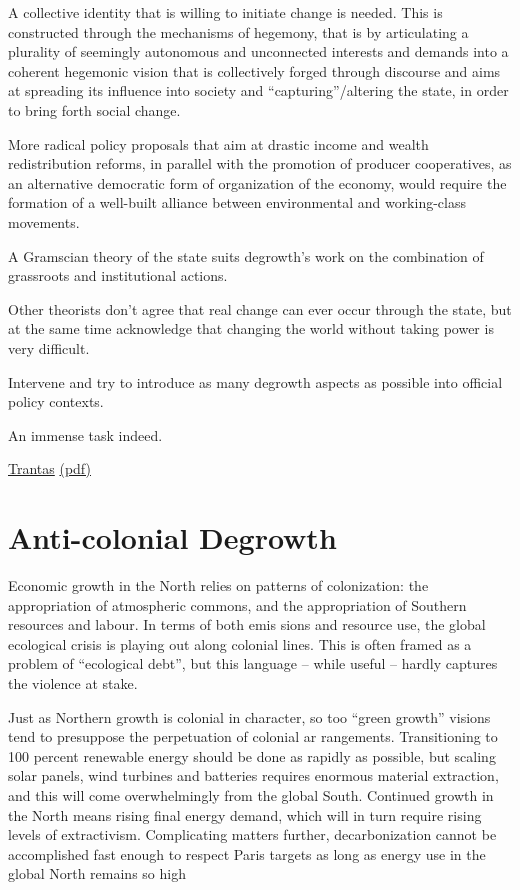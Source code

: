 \documentclass[
]{book}
\begin{document}
A collective identity that is willing to initiate change is needed. This is
constructed through the mechanisms of hegemony, that is by
articulating a plurality of seemingly autonomous and unconnected interests and demands into a coherent
hegemonic vision that is collectively forged through discourse and aims at spreading its influence into society
and ``capturing''/altering the state, in order to bring forth social change.

More radical policy proposals that aim at drastic income and wealth
redistribution reforms, in parallel with the promotion of producer cooperatives, as an alternative democratic
form of organization of the economy, would require the formation of a well-built alliance between
environmental and working-class movements.

A Gramscian theory of the state suits degrowth's work on the combination of grassroots and institutional actions.

Other theorists don't agree that real change can ever occur through the state, but at the same time
acknowledge that changing the world without taking power is very difficult.

Intervene and try to
introduce as many degrowth aspects as possible into official policy contexts.

An immense task indeed.

\href{https://journals.librarypublishing.arizona.edu/jpe/article/id/2362/}{Trantas}
\href{pdf/Trantas_2021_Degrowth_vs_Sustainable.pdf}{(pdf)}

\hypertarget{anti-colonial-degrowth}{%
\section{Anti-colonial Degrowth}\label{anti-colonial-degrowth}}

Economic growth in the North relies on patterns of
colonization: the appropriation of atmospheric commons, and the
appropriation of Southern resources and labour. In terms of both emis­
sions and resource use, the global ecological crisis is playing out along
colonial lines. This is often framed as a problem of ``ecological debt'', but
this language -- while useful -- hardly captures the violence at stake.

Just as Northern growth is colonial in character, so too ``green
growth'' visions tend to presuppose the perpetuation of colonial ar­
rangements. Transitioning to 100 percent renewable energy should be
done as rapidly as possible, but scaling solar panels, wind turbines and
batteries requires enormous material extraction, and this will come
overwhelmingly from the global South. Continued growth in the North
means rising final energy demand, which will in turn require rising
levels of extractivism. Complicating matters further, decarbonization
cannot be accomplished fast enough to respect Paris targets as long as
energy use in the global North remains so high
\end{document}
